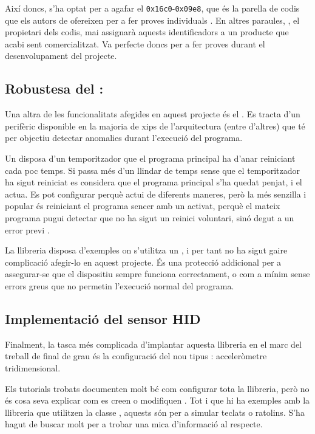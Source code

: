 Així doncs, s'ha optat per a agafar el 
\texttt{0x16c0}-\texttt{0x09e8}, que és la
parella de codis que els autors de  ofereixen per a fer proves
individuals \cite{Vusb}. En altres paraules, , el propietari dels
codis, mai assignarà aquests identificadors a un producte que acabi sent
comercialitzat. Va perfecte doncs per a fer proves durant el desenvolupament del
projecte.

\subsection{Robustesa del : }

Una altra de les funcionalitats afegides en aquest projecte és el .
Es tracta d'un perifèric disponible en la majoria de xips de l'arquitectura
 (entre d'altres) que té per objectiu detectar anomalies durant
l'execució del programa.

Un  disposa d'un temporitzador que el programa principal ha d'anar
reiniciant cada poc temps. Si passa més d'un llindar de temps sense que el
temporitzador ha sigut reiniciat es considera que el programa principal s'ha
quedat penjat, i el  actua. Es pot configurar perquè actui de
diferents maneres, però la més senzilla i popular és reiniciant el programa
sencer amb un  activat, perquè el mateix programa pugui detectar que
no ha sigut un reinici voluntari, sinó degut a un error previ \cite{Watchdog}.

La llibreria  disposa d'exemples on s'utilitza un , i
per tant no ha sigut gaire complicació afegir-lo en aquest projecte. És una
protecció addicional per a assegurar-se que el dispositiu sempre funciona
correctament, o com a mínim sense errors greus que no permetin l'execució
normal del programa.

\subsection{Implementació del sensor HID}

Finalment, la tasca més complicada d'implantar aquesta llibreria en el marc
del treball de final de grau és la configuració del nou tipus :
acceleròmetre tridimensional.

Els tutorials trobats documenten molt bé com configurar tota la llibreria,
però no és cosa seva explicar com es creen o modifiquen .
Tot i que hi ha exemples amb la llibreria que utilitzen la classe ,
aquests són per a simular teclats o ratolins. S'ha hagut de buscar molt per a
trobar una mica d'informació al respecte.


